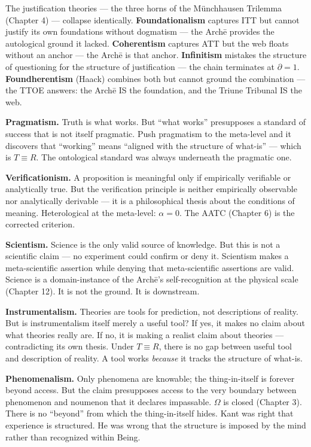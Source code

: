 \documentclass[10pt, openany, oneside]{book}
\begin{document}
The justification theories --- the three horns of the M\"{u}nchhausen Trilemma (Chapter 4) --- collapse identically. \textbf{Foundationalism} captures ITT but cannot justify its own foundations without dogmatism --- the Arch\={e} provides the autological ground it lacked. \textbf{Coherentism} captures ATT but the web floats without an anchor --- the Arch\={e} is that anchor. \textbf{Infinitism} mistakes the structure of questioning for the structure of justification --- the chain terminates at $\partial = 1$. \textbf{Foundherentism} (Haack) combines both but cannot ground the combination --- the TTOE answers: the Arch\={e} IS the foundation, and the Triune Tribunal IS the web.

\textbf{Pragmatism.} Truth is what works. But ``what works'' presupposes a standard of success that is not itself pragmatic. Push pragmatism to the meta-level and it discovers that ``working'' means ``aligned with the structure of what-is'' --- which is $T \equiv R$. The ontological standard was always underneath the pragmatic one.

\textbf{Verificationism.} A proposition is meaningful only if empirically verifiable or analytically true. But the verification principle is neither empirically observable nor analytically derivable --- it is a philosophical thesis about the conditions of meaning. Heterological at the meta-level: $\alpha = 0$. The AATC (Chapter 6) is the corrected criterion.

\textbf{Scientism.} Science is the only valid source of knowledge. But this is not a scientific claim --- no experiment could confirm or deny it. Scientism makes a meta-scientific assertion while denying that meta-scientific assertions are valid. Science is a domain-instance of the Arch\={e}'s self-recognition at the physical scale (Chapter 12). It is not the ground. It is downstream.

\textbf{Instrumentalism.} Theories are tools for prediction, not descriptions of reality. But is instrumentalism itself merely a useful tool? If yes, it makes no claim about what theories really are. If no, it is making a realist claim about theories --- contradicting its own thesis. Under $T \equiv R$, there is no gap between useful tool and description of reality. A tool works \textit{because} it tracks the structure of what-is.

\textbf{Phenomenalism.} Only phenomena are knowable; the thing-in-itself is forever beyond access. But the claim presupposes access to the very boundary between phenomenon and noumenon that it declares impassable. $\Omega$ is closed (Chapter 3). There is no ``beyond'' from which the thing-in-itself hides. Kant was right that experience is structured. He was wrong that the structure is imposed by the mind rather than recognized within Being.
\end{document}
